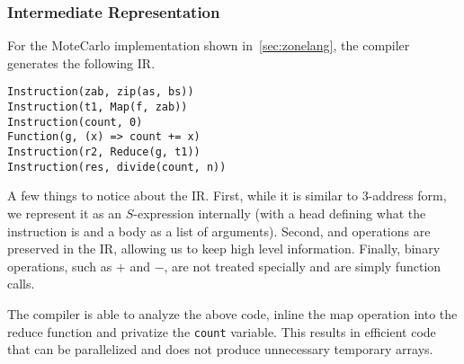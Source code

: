 \subsubsection{Intermediate Representation}

For the MoteCarlo implementation shown in~\ref{sec:zonelang}, the 
	compiler generates the following IR.

\begin{verbatim}
Instruction(zab, zip(as, bs))
Instruction(t1, Map(f, zab))
Instruction(count, 0)
Function(g, (x) => count += x)
Instruction(r2, Reduce(g, t1))
Instruction(res, divide(count, n))
\end{verbatim}

A few things to notice about the IR.
First, while it is similar to $3$-address form,
	we represent it as an $S$-expression internally 
	(with a head defining what the instruction is and a body
	as a list of arguments).
Second,  and  operations are preserved in the IR, 
	allowing us to keep high level information.
Finally, binary operations, such as $+$ and $-$, are not
	treated specially and are simply function calls.

The compiler is able to analyze the above code, inline the map operation
into the reduce function and privatize the \texttt{count} variable. This
results in efficient code that can be parallelized and does not produce
unnecessary temporary arrays.
